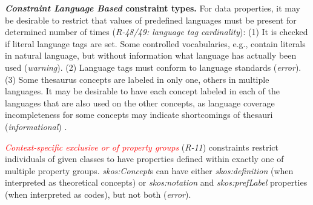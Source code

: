 \documentclass[conference]{IEEEtran}
\begin{document}

\textbf{\emph{Constraint Language Based} constraint types.}
For data properties, it may be desirable to restrict that values of predefined languages must be present for determined number of times (\emph{R-48/49: language tag cardinality}):
(1) It is checked if literal language tags are set. Some controlled vocabularies, e.g., contain literals in natural language, but without information what language has actually been used (\emph{warning}). 
(2) Language tags must conform to language standards (\emph{error}). 
(3) Some thesaurus concepts are labeled in only one, others in multiple languages. 
It may be desirable to have each concept labeled in each of the languages that are also used on the other concepts,
as language coverage incompleteness for some concepts may indicate shortcomings of thesauri (\emph{informational})
\cite{MaderHaslhoferIsaac2012}.

\textcolor{red}{\emph{Context-specific exclusive or of property groups}} (\emph{R-11}) constraints
restrict individuals of given classes to have properties defined within exactly one of multiple property groups.
\emph{skos:Concept}s can have either \emph{skos:definition} (when interpreted as theoretical concepts) or \emph{skos:notation} and \emph{skos:prefLabel} properties (when interpreted as codes), but not both (\emph{error}).
\end{document}
